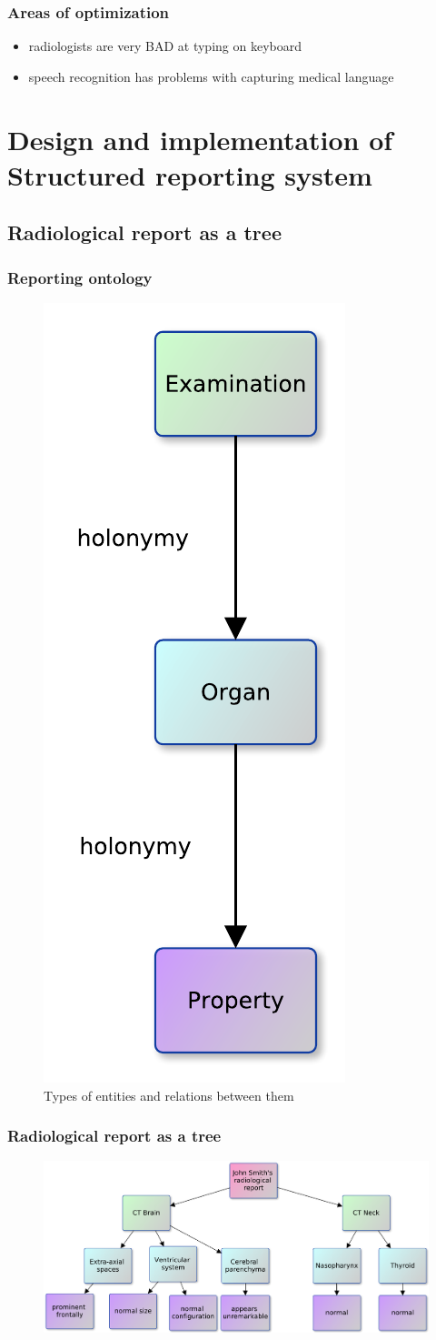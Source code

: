 \documentclass{beamer}
\begin{document}
\begin{frame}
\frametitle{Areas of optimization}
\begin{itemize}
	\item radiologists are \alert{very BAD} at typing on keyboard
	\item speech recognition has problems with capturing medical language
	\
\end{itemize}
\end{frame}

\section{Design and implementation of Structured reporting system}
\subsection{Radiological report as a tree}

\begin{frame}
\frametitle{Reporting ontology}
\begin{figure}
	\centering
\includegraphics[width=0.2\linewidth]{../report-semantic}
\caption{Types of entities and relations between them}
\label{fig:report-ontology}
\end{figure}
\end{frame}


\begin{frame}
\frametitle{Radiological report as a tree}
\begin{figure}
	\centering
	\includegraphics[width=1\linewidth]{../report-tree}
	\label{fig:report-tree}
\end{figure}
\end{frame}
\end{document}
